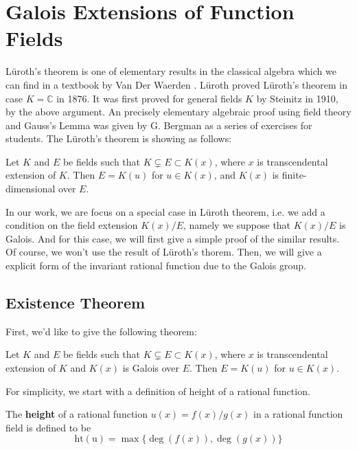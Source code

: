 \chapter{Galois Extensions of Function Fields}
\label{chap:chap-eight}

L{\"u}roth's theorem is one of elementary results in the classical algebra which we can find in a textbook by Van Der Waerden \citep{van1967algebra}. L{\"u}roth \citep{luroth1875beweis} proved L{\"u}roth's theorem in case $K=\mathbb{C}$ in 1876. It was first proved for general fields $K$ by Steinitz \citep{steinitz1910algebraische} in 1910, by the above argument. An precisely elementary algebraic proof using field theory and Gauss's Lemma was given by G. Bergman as a series of exercises for students. The L{\"u}roth's theorem is showing as follows:
\begin{theorem}
Let $K$ and $E$ be fields such that $K\subsetneq E \subset K(x)$, where $x$ is transcendental extension of $K$. Then $E=K(u)$ for $u\in K(x)$, and $K(x)$ is finite-dimensional over $E$.
\end{theorem}

In our work, we are focus on a special case in L{\"u}roth theorem, i.e. we add a condition on the field extension $K(x)/E$, namely we suppose that $K(x)/E$ is Galois. And for this case, we will first give a simple proof of the similar results. Of course, we won't use the result of L{\"u}roth's thorem. Then, we will give a explicit form of the invariant rational function due to the Galois group.

\section{Existence Theorem}
First, we'd like to give the following theorem: 
\begin{theorem}\label{thm:luroth-zwc}
Let $K$ and $E$ be fields such that $K\subsetneq E \subset K(x)$, where $x$ is transcendental extension of $K$ and $K(x)$ is Galois over $E$. Then $E=K(u)$ for $u\in K(x)$.
\end{theorem}

For simplicity, we start with a definition of height of a rational function.

\begin{definition}[height]
The \textbf{height} of a rational function $u(x)=f(x)/g(x)$ in a rational function field is defined to be $$\operatorname{ht(u)}=\max\{\deg(f(x)),\deg(g(x))\}$$ 
\end{definition}

